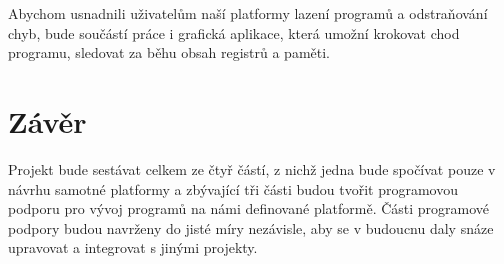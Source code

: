 Abychom usnadnili uživatelům naší platformy lazení programů a odstraňování chyb, bude součástí práce i grafická aplikace, která umožní krokovat chod programu, sledovat za běhu obsah registrů a paměti.

\section{Závěr}

Projekt bude sestávat celkem ze čtyř částí, z nichž jedna bude spočívat pouze v návrhu samotné platformy a zbývající tři části budou tvořit programovou podporu pro vývoj programů na námi definované platformě. Části programové podpory budou navrženy do jisté míry nezávisle, aby se v budoucnu daly snáze upravovat a integrovat s jinými projekty.
